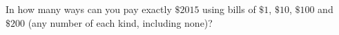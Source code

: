 In how many ways can you pay exactly $\$2015$ using bills of $\$1$, $\$10$, $\$100$ and $\$200$ (any number of each kind, including none)?
